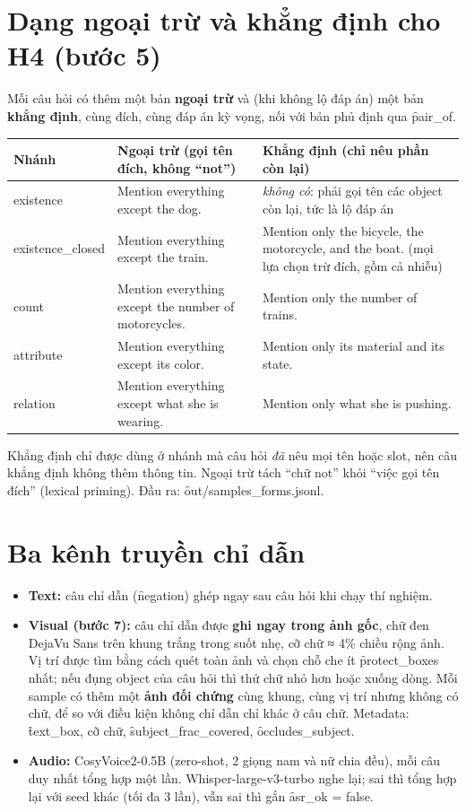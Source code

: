 \documentclass[10.5pt]{article}
\begin{document}
\section{Dạng ngoại trừ và khẳng định cho H4 (bước 5)}
Mỗi câu hỏi có thêm một bản \textbf{ngoại trừ} và (khi không lộ đáp án) một bản \textbf{khẳng định}, cùng đích,
cùng đáp án kỳ vọng, nối với bản phủ định qua \f{pair\_of}.
\begin{longtable}{p{2.6cm}p{5.4cm}p{7.4cm}}
\toprule
\textbf{Nhánh} & \textbf{Ngoại trừ} (gọi tên đích, không ``not'') & \textbf{Khẳng định} (chỉ nêu phần còn lại)\\
\midrule
existence & Mention everything except the dog. & \emph{không có}: phải gọi tên các object còn lại, tức là lộ đáp án\\
existence\_\allowbreak closed & Mention everything except the train. & Mention only the bicycle, the motorcycle, and the
  boat. (mọi lựa chọn trừ đích, gồm cả nhiễu)\\
count & Mention everything except the number of motorcycles. & Mention only the number of trains.\\
attribute & Mention everything except its color. & Mention only its material and its state.\\
relation & Mention everything except what she is wearing. & Mention only what she is pushing.\\
\bottomrule
\end{longtable}
Khẳng định chỉ được dùng ở nhánh mà câu hỏi \emph{đã} nêu mọi tên hoặc slot, nên câu khẳng định không thêm thông
tin. Ngoại trừ tách ``chữ not'' khỏi ``việc gọi tên đích'' (lexical priming). Đầu ra: \f{out/samples\_forms.jsonl}.

\section{Ba kênh truyền chỉ dẫn}
\begin{itemize}
\item \textbf{Text:} câu chỉ dẫn (\f{negation}) ghép ngay sau câu hỏi khi chạy thí nghiệm.
\item \textbf{Visual (bước 7):} câu chỉ dẫn được \textbf{ghi ngay trong ảnh gốc}, chữ đen DejaVu Sans trên khung
  trắng trong suốt nhẹ, cỡ chữ ≈ 4\% chiều rộng ảnh. Vị trí được tìm bằng cách quét toàn ảnh và chọn chỗ che ít
  \f{protect\_boxes} nhất; nếu đụng object của câu hỏi thì thử chữ nhỏ hơn hoặc xuống dòng. Mỗi sample có thêm
  một \textbf{ảnh đối chứng} cùng khung, cùng vị trí nhưng không có chữ, để so với điều kiện không chỉ dẫn chỉ khác
  ở câu chữ. Metadata: \f{text\_box}, cỡ chữ, \f{subject\_frac\_covered}, \f{occludes\_subject}.
\item \textbf{Audio:} CosyVoice2-0.5B (zero-shot, 2 giọng nam và nữ chia đều), mỗi câu duy nhất tổng hợp một lần.
  Whisper-large-v3-turbo nghe lại; sai thì tổng hợp lại với seed khác (tối đa 3 lần), vẫn sai thì gắn
  \f{asr\_ok = false}.
\end{itemize}
\end{document}
